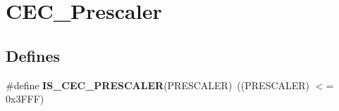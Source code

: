 \hypertarget{group__CEC__Prescaler}{
\section{CEC\_\-Prescaler}
\label{group__CEC__Prescaler}
}
\subsection*{Defines}
\begin{DoxyCompactItemize}
\item 
\hypertarget{group__CEC__Prescaler_ga88ad62af56298609444942b8f05b6d23}{
\#define {\bfseries IS\_\-CEC\_\-PRESCALER}(PRESCALER)~((PRESCALER) $<$= 0x3FFF)}
\label{group__CEC__Prescaler_ga88ad62af56298609444942b8f05b6d23}

\end{DoxyCompactItemize}
